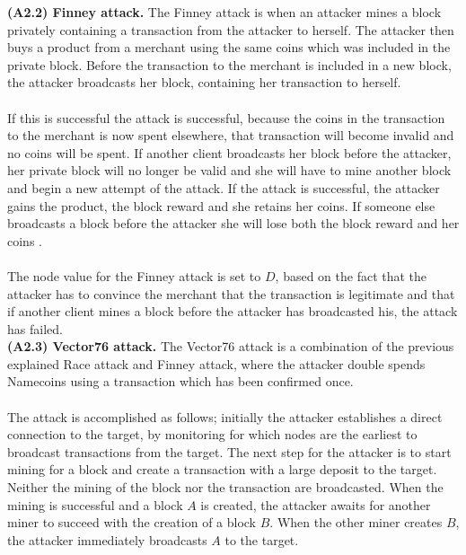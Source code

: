 \documentclass[frame, english]{idamasterthesis}
\begin{document}
\noindent    
\textbf{(A2.2) Finney attack.} The Finney attack is when an attacker mines a block privately containing a transaction from the attacker to herself.  The attacker then buys a product from a merchant using the same coins which was included in the private block. Before the transaction to the merchant is included in a new block, the attacker broadcasts her block, containing her transaction to herself.\\\\
\noindent
If this is successful the attack is successful, because the coins in the transaction to the merchant is now spent elsewhere, that transaction will become invalid and no coins will be spent. If another client broadcasts her block before the attacker, her private block will no longer be valid and she will have to mine another block and begin a new attempt of the attack. If the attack is successful, the attacker gains the product, the block reward and she retains her coins. If someone else broadcasts a block before the attacker she will lose both the block reward and her coins \cite{bitcoin-attacks}. \\\\
The node value for the Finney attack is set to $D$, based on the fact that the attacker has to convince the merchant that the transaction is legitimate and that if another client mines a block before the attacker has broadcasted his, the attack has failed. \\

\noindent
\textbf{(A2.3) Vector76 attack.} The Vector76 attack is a combination of the previous explained Race attack and Finney attack, where the attacker double spends Namecoins using a transaction which has been confirmed once.\\\\
\noindent
The attack is accomplished as follows; initially the attacker establishes a direct connection to the target, by monitoring for which nodes are the earliest to broadcast transactions from the target. The next step for the attacker is to start mining for a block and create a transaction with a large deposit to the target. Neither the mining of the block nor the transaction are broadcasted. When the mining is successful and a block $A$ is created, the attacker awaits for another miner to succeed with the creation of a block $B$. When the other miner creates $B$, the attacker immediately broadcasts $A$ to the target.

\pagebreak
\end{document}
